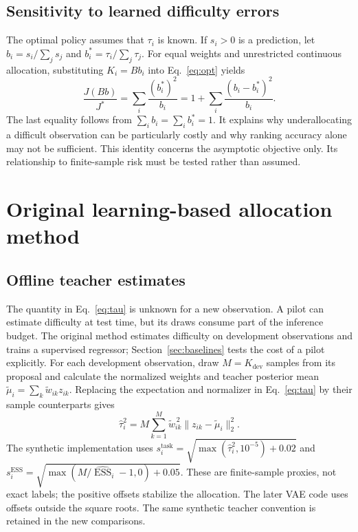 \documentclass[11pt,letterpaper]{article}
\newcommand{\norm}[1]{\lVert #1\rVert_2}
\newcommand{\ESS}{\operatorname{ESS}}
\newcommand{\dev}{K_{\mathrm{dev}}}
\newcommand{\task}{\mathrm{task}}
\begin{document}
\subsection{Sensitivity to learned difficulty errors}
The optimal policy assumes that $\tau_i$ is known. If $s_i>0$ is a prediction, let $b_i=s_i/\sum_j s_j$ and $b_i^*=\tau_i/\sum_j\tau_j$. For equal weights and unrestricted continuous allocation, substituting $K_i=Bb_i$ into Eq.~\eqref{eq:opt} yields
\begin{equation}
 \frac{J(Bb)}{J^*}=\sum_i\frac{(b_i^*)^2}{b_i}=1+\sum_i\frac{(b_i-b_i^*)^2}{b_i}.
 \label{eq:regret}
\end{equation}
The last equality follows from $\sum_i b_i=\sum_i b_i^*=1$. It explains why underallocating a difficult observation can be particularly costly and why ranking accuracy alone may not be sufficient. This identity concerns the asymptotic objective only. Its relationship to finite-sample risk must be tested rather than assumed.

\clearpage
\section{Original learning-based allocation method}
\subsection{Offline teacher estimates}
The quantity in Eq.~\eqref{eq:tau} is unknown for a new observation. A pilot can estimate difficulty at test time, but its draws consume part of the inference budget. The original method estimates difficulty on development observations and trains a supervised regressor; Section~\ref{sec:baselines} tests the cost of a pilot explicitly. For each development observation, draw $M=\dev$ samples from its proposal and calculate the normalized weights and teacher posterior mean $\widetilde\mu_i=\sum_k\widetilde w_{ik}z_{ik}$. Replacing the expectation and normalizer in Eq.~\eqref{eq:tau} by their sample counterparts gives
\begin{equation}
 \widehat\tau_i^2=M\sum_{k=1}^{M}\widetilde w_{ik}^{\,2}\norm{z_{ik}-\widetilde\mu_i}^2.
 \label{eq:teacher}
\end{equation}
The synthetic implementation uses $s_i^{\task}=\sqrt{\max(\widehat\tau_i^2,10^{-5})+0.02}$ and $s_i^{\mathrm{ESS}}=\sqrt{\max(M/\widehat{\ESS}_i-1,0)+0.05}$. These are finite-sample proxies, not exact labels; the positive offsets stabilize the allocation. The later VAE code uses offsets outside the square roots. The same synthetic teacher convention is retained in the new comparisons.
\end{document}
